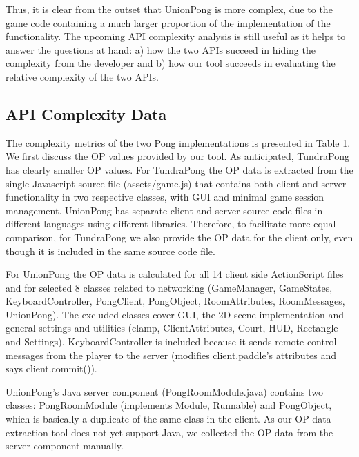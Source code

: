 \documentclass[conference]{IEEEtran}
\begin{document}

Thus, it is clear from the outset that UnionPong is more complex, due
to the game code containing a much larger proportion of the
implementation of the functionality. The upcoming API complexity
analysis is still useful as it helps to answer the questions at hand:
a) how the two APIs succeed in hiding the complexity from the
developer and b) how our tool succeeds in evaluating the relative
complexity of the two APIs.

\subsection{API Complexity Data}

The complexity metrics of the two Pong implementations is presented in
Table 1. We first discuss the OP values provided by our tool. As
anticipated, TundraPong has clearly smaller OP values. For TundraPong
the OP data is extracted from the single Javascript source file
(assets/game.js) that contains both client and server functionality in
two respective classes, with GUI and minimal game session
management. UnionPong has separate client and server source code files
in different languages using different libraries. Therefore, to
facilitate more equal comparison, for TundraPong we also provide the
OP data for the client only, even though it is included in the same
source code file.

For UnionPong the OP data is calculated for all 14 client side
ActionScript files and for selected 8 classes related to networking
(GameManager, GameStates, KeyboardController, PongClient, PongObject,
RoomAttributes, RoomMessages, UnionPong). The excluded classes cover
GUI, the 2D scene implementation and general settings and utilities
(clamp, ClientAttributes, Court, HUD, Rectangle and
Settings). KeyboardController is included because it sends remote
control messages from the player to the server (modifies
client.paddle’s attributes and says client.commit()).

UnionPong’s Java server component (PongRoomModule.java) contains two
classes: PongRoomModule (implements Module, Runnable) and PongObject,
which is basically a duplicate of the same class in the client. As our
OP data extraction tool does not yet support Java, we collected the OP
data from the server component manually.
\end{document}
